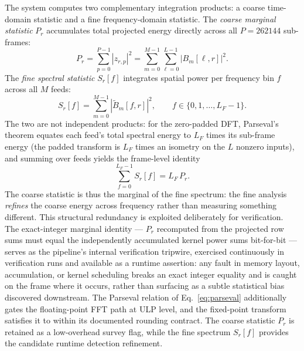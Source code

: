 The system computes two complementary integration products: a coarse time-domain statistic and a fine frequency-domain statistic. The \textit{coarse marginal statistic} $P_r$ accumulates total projected energy directly across all $P = 262144$ sub-frames:
\begin{equation}
P_r = \sum_{p=0}^{P-1} |z_{r,p}|^2 = \sum_{m=0}^{M-1} \sum_{\ell=0}^{L-1} \left| B_m[\ell,r] \right|^2.
\end{equation}
The \textit{fine spectral statistic} $S_r[f]$ integrates spatial power per frequency bin $f$ across all $M$ feeds:
\begin{equation}
S_r[f] = \sum_{m=0}^{M-1} \left| \widetilde{B}_m[f,r] \right|^2, \qquad f \in \{0, 1, \dots, L_F-1\}.
\end{equation}
The two are not independent products: for the zero-padded DFT, Parseval's theorem equates each feed's total spectral energy to $L_F$ times its sub-frame energy (the padded transform is $L_F$ times an isometry on the $L$ nonzero inputs), and summing over feeds yields the frame-level identity
\begin{equation}
\label{eq:parseval}
\sum_{f=0}^{L_F-1} S_r[f] = L_F \, P_r.
\end{equation}
The coarse statistic is thus the marginal of the fine spectrum: the fine analysis \emph{refines} the coarse energy across frequency rather than measuring something different. This structural redundancy is exploited deliberately for verification. The exact-integer marginal identity --- $P_r$ recomputed from the projected row sums must equal the independently accumulated kernel power sums bit-for-bit --- serves as the pipeline's internal verification tripwire, exercised continuously in verification runs and available as a runtime assertion: any fault in memory layout, accumulation, or kernel scheduling breaks an exact integer equality and is caught on the frame where it occurs, rather than surfacing as a subtle statistical bias discovered downstream. The Parseval relation of Eq.~\eqref{eq:parseval} additionally gates the floating-point FFT path at ULP level, and the fixed-point transform satisfies it to within its documented rounding contract. The coarse statistic $P_r$ is retained as a low-overhead survey flag, while the fine spectrum $S_r[f]$ provides the candidate runtime detection refinement.

